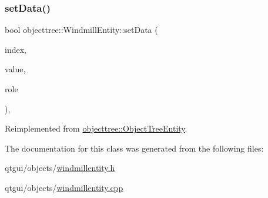 \subsubsection{\texorpdfstring{setData()}{setData()}}
{\footnotesize\ttfamily bool objecttree\+::\+Windmill\+Entity\+::set\+Data (\begin{DoxyParamCaption}\item[{const Q\+Model\+Index \&}]{index,  }\item[{const Q\+Variant \&}]{value,  }\item[{int}]{role }\end{DoxyParamCaption})\hspace{0.3cm}{\ttfamily [override]}, {\ttfamily [virtual]}}



Reimplemented from \mbox{\hyperlink{classobjecttree_1_1_object_tree_entity_ab6742194e637093cb1571998bee88ff5}{objecttree\+::\+Object\+Tree\+Entity}}.



The documentation for this class was generated from the following files\+:\begin{DoxyCompactItemize}
\item 
qtgui/objects/\mbox{\hyperlink{windmillentity_8h}{windmillentity.\+h}}\item 
qtgui/objects/\mbox{\hyperlink{windmillentity_8cpp}{windmillentity.\+cpp}}\end{DoxyCompactItemize}
